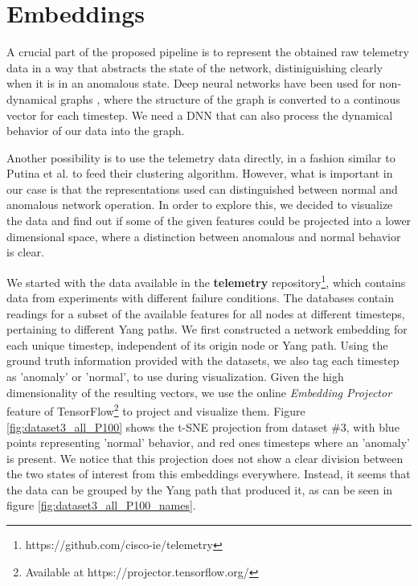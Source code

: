 \newpage
\section{Embeddings}
\label{sec:embeddings}

A crucial part of the proposed pipeline is to represent the obtained raw telemetry data in a way that abstracts the state of the network, distiniguishing clearly when it is in an anomalous state.
Deep neural networks have been used for non-dynamical graphs \cite{venkatakrishnan_graph2seq_2018}, where the structure of the graph is converted to a continous vector for each timestep.
We need a DNN that can also process the dynamical behavior of our data into the graph.

Another possibility is to use the telemetry data directly, in a fashion similar to Putina et al.\cite{putina_telemetry-based_2018} to feed their clustering algorithm.
However, what is important in our case is that the representations used can distinguished between normal and anomalous network operation.
In order to explore this, we decided to visualize the data and find out if some of the given features could be projected into a lower dimensional space, where a distinction between anomalous and normal behavior is clear.

We started with the data available in the \textbf{telemetry} repository\footnote{https://github.com/cisco-ie/telemetry}, which contains data from experiments with different failure conditions.
The databases contain readings for a subset of the available features for all nodes at different timesteps, pertaining to different Yang paths.
We first constructed a network embedding for each unique timestep, independent of its origin node or Yang path.
Using the ground truth information provided with the datasets, we also tag each timestep as 'anomaly' or 'normal', to use during visualization.
Given the high dimensionality of the resulting vectors, we use the online \textit{Embedding Projector} feature of TensorFlow\footnote{Available at https://projector.tensorflow.org/} to project and visualize them.
Figure \ref{fig:dataset3_all_P100} shows the t-SNE projection from dataset \#3, with blue points representing 'normal' behavior, and red ones timesteps where an 'anomaly' is present.
We notice that this projection does not show a clear division between the two states of interest from this embeddings everywhere.
Instead, it seems that the data can be grouped by the Yang path that produced it, as can be seen in figure \ref{fig:dataset3_all_P100_names}.

